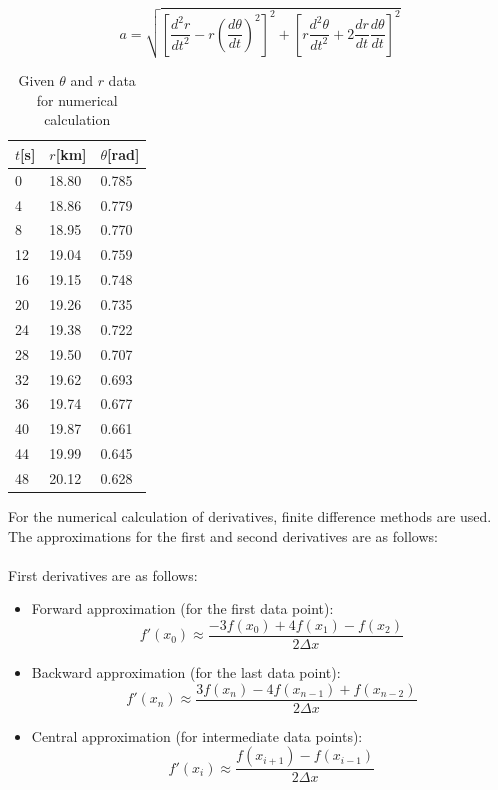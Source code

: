 \documentclass[12pt, a4paper]{article}
\numberwithin{equation}{section}
\begin{document}
\begin{equation}
a = \sqrt{\left[\frac{d^2 r}{dt^2} - r\left(\frac{d \theta}{dt}\right)^2\right]^2 + \left[r \frac{d^2 \theta}{dt^2} + 2 \frac{dr}{dt} \frac{d \theta}{dt}\right]^2}
\end{equation}


\begin{table}[!ht]
    \centering
    \caption{Given $\theta$ and $r$ data for numerical calculation}
    \begin{tabular}{lll}
    \hline
        $t$[s] & $r$[km] &	$\theta$[rad] \\ \hline
        0 & 18.80 & 0.785 \\ 
        4 & 18.86 & 0.779 \\ 
        8 & 18.95 & 0.770 \\ 
        12 & 19.04 & 0.759 \\ 
        16 & 19.15 & 0.748 \\ 
        20 & 19.26 & 0.735 \\ 
        24 & 19.38 & 0.722 \\ 
        28 & 19.50 & 0.707 \\ 
        32 & 19.62 & 0.693 \\ 
        36 & 19.74 & 0.677 \\ 
        40 & 19.87 & 0.661 \\ 
        44 & 19.99 & 0.645 \\ 
        48 & 20.12 & 0.628 \\ \hline
    \end{tabular}
\end{table}


For the numerical calculation of derivatives, finite difference methods are used. The approximations for the first and second derivatives are as follows:
\\
\\
First derivatives are as follows:

\begin{itemize}
    \item Forward approximation (for the first data point):
    \begin{equation}
    f'(x_0) \approx \frac{-3f(x_0) + 4f(x_1) - f(x_2)}{2\Delta x} \end{equation} 
    \item Backward approximation (for the last data point):
    \begin{equation} f'(x_n) \approx \frac{3f(x_n) - 4f(x_{n-1}) + f(x_{n-2})}{2\Delta x} \end{equation} 
    \item Central approximation (for intermediate data points):
    \begin{equation}
    f'(x_i) \approx \frac{f(x_{i+1}) - f(x_{i-1})}{2\Delta x} \end{equation} 
\end{itemize}
\end{document}
